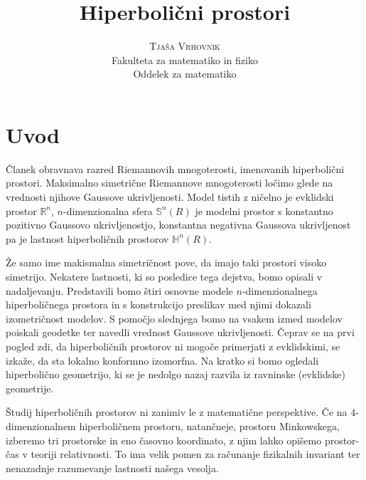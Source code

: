 \documentclass[a4paper]{article}
\begin{document}
\title{\Huge\textbf{Hiperbolični prostori}} 
\author{\large\textsc{Tjaša Vrhovnik}\\
	Fakulteta za matematiko in fiziko\\
	Oddelek za matematiko}

\thispagestyle{empty}

\maketitle

\newpage

\tableofcontents

\newpage

\section{Uvod}

Članek obravnava razred Riemannovih mnogoterosti, imenovanih hiperbolični prostori. Maksimalno simetrične Riemannove mnogoterosti ločimo glede na vrednosti njihove Gaussove ukrivljenosti. Model tistih z ničelno je evklidski prostor $\mathbb{R}^{n}$, $n$-dimenzionalna sfera $\mathbb{S}^{n}(R)$ je modelni prostor s konstantno pozitivno Gaussovo ukrivljenostjo, konstantna negativna Gaussova ukrivljenost pa je lastnost hiperboličnih prostorov $\mathbb{H}^{n}(R)$.

Že samo ime makismalna simetričnost pove, da imajo taki prostori visoko simetrijo. Nekatere lastnosti, ki so posledice tega dejstva, bomo opisali v nadaljevanju. Predstavili bomo štiri osnovne modele $n$-dimenzionalnega hiperboličnega prostora in s konstrukcijo preslikav med njimi dokazali izometričnost modelov. S pomočjo slednjega bomo na vsakem izmed modelov poiskali geodetke ter navedli vrednost Gaussove ukrivljenosti. Čeprav se na prvi pogled zdi, da hiperboličnih prostorov ni mogoče primerjati z evklidskimi, se izkaže, da sta lokalno konformno izomorfna. Na kratko si bomo ogledali hiperbolično geometrijo, ki se je nedolgo nazaj razvila iz ravninske (evklidske) geometrije. 

Študij hiperboličnih prostorov ni zanimiv le z matematične perspektive. Če na $4$-dimenzionalnem hiperboličnem prostoru, natančneje, prostoru Minkowskega, izberemo tri prostorske in eno časovno koordinato, z njim lahko opišemo prostor-čas v teoriji relativnosti. To ima velik pomen za računanje fizikalnih invariant ter nenazadnje razumevanje lastnosti našega vesolja. 
\end{document}
